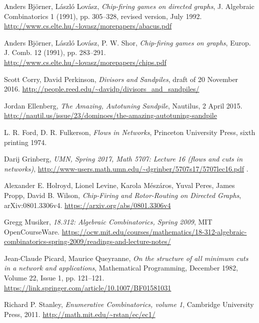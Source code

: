 \documentclass[numbers=enddot,12pt,final,onecolumn,notitlepage]{scrartcl}%
\theoremstyle{definition}
\begin{document}
\begin{thebibliography}{99999999}

Anders Bj\"orner, L\'aszl\'o Lov\'asz,
\textit{Chip-firing games on directed graphs},
J. Algebraic Combinatorics 1 (1991), pp. 305--328,
revised version, July 1992.
\newline\url{http://www.cs.elte.hu/~lovasz/morepapers/abacus.pdf}

Anders Bj\"orner, L\'aszl\'o Lov\'asz, P. W. Shor,
\textit{Chip-firing games on graphs},
Europ. J. Comb. 12 (1991), pp. 283--291.
\newline\url{http://www.cs.elte.hu/~lovasz/morepapers/chips.pdf}

Scott Corry, David Perkinson,
\textit{Divisors and Sandpiles},
draft of 20 November 2016.
\newline\url{http://people.reed.edu/~davidp/divisors_and_sandpiles/}

Jordan Ellenberg,
\textit{The Amazing, Autotuning Sandpile},
Nautilus, 2 April 2015.
\newline\url{http://nautil.us/issue/23/dominoes/the-amazing-autotuning-sandpile}

L. R. Ford, D. R. Fulkerson,
\textit{Flows in Networks},
Princeton University Press,
sixth printing 1974.

Darij Grinberg,
\textit{UMN, Spring 2017, Math 5707: Lecture 16 (flows and cuts in networks)},
\newline\url{http://www-users.math.umn.edu/~dgrinber/5707s17/5707lec16.pdf} .

Alexander E. Holroyd, Lionel Levine, Karola M\'esz\'aros,
Yuval Peres, James Propp, David B. Wilson,
\textit{Chip-Firing and Rotor-Routing on Directed Graphs},
arXiv:0801.3306v4.
\newline\url{https://arxiv.org/abs/0801.3306v4}

Gregg Musiker,
\textit{18.312: Algebraic Combinatorics, Spring 2009},
MIT OpenCourseWare.
\newline\url{https://ocw.mit.edu/courses/mathematics/18-312-algebraic-combinatorics-spring-2009/readings-and-lecture-notes/}

Jean-Claude Picard, Maurice Queyranne,
\textit{On the structure of all minimum cuts in a network and applications},
Mathematical Programming,
December 1982, Volume 22, Issue 1, pp. 121--121.
\newline\url{https://link.springer.com/article/10.1007/BF01581031}

Richard P. Stanley, \textit{Enumerative
Combinatorics, volume 1}, Cambridge University Press, 2011. \newline%
\url{http://math.mit.edu/~rstan/ec/ec1/}

\end{thebibliography}
\end{document}

